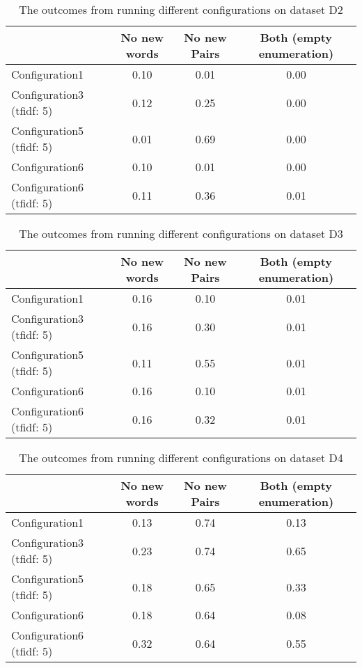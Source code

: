 \begin{table}
  \begin{tabular}{|l|c|c|c|}
    \hline
    &  No new words & No new Pairs & Both (empty enumeration) \\ \hline
    Configuration1                    & 0.10  & 0.01  & 0.00 \\ \hline
    Configuration3 (tfidf: 5)         & 0.12  & 0.25  & 0.00 \\ \hline
    Configuration5 (tfidf: 5)         & 0.01  & 0.69  & 0.00 \\ \hline
    Configuration6                    & 0.10  & 0.01  & 0.00 \\ \hline
    Configuration6 (tfidf: 5)         & 0.11  & 0.36  & 0.01 \\ \hline
  \end{tabular}
  \caption{The outcomes from running different configurations on dataset D2}
  \label{tab:d2}
\end{table}

\begin{table}
  \begin{tabular}{|l|c|c|c|}
    \hline
    &  No new words & No new Pairs & Both (empty enumeration) \\ \hline
    Configuration1                    & 0.16  & 0.10  & 0.01 \\ \hline
    Configuration3 (tfidf: 5)         & 0.16  & 0.30  & 0.01 \\ \hline
    Configuration5 (tfidf: 5)         & 0.11  & 0.55  & 0.01 \\ \hline
    Configuration6                    & 0.16  & 0.10  & 0.01 \\ \hline
    Configuration6 (tfidf: 5)         & 0.16  & 0.32  & 0.01 \\ \hline
  \end{tabular}
  \caption{The outcomes from running different configurations on dataset D3}
  \label{tab:d3}
\end{table}

\begin{table}
  \begin{tabular}{|l|c|c|c|}
    \hline
    &  No new words & No new Pairs & Both (empty enumeration) \\ \hline
    Configuration1                    & 0.13  & 0.74  & 0.13 \\ \hline
    Configuration3 (tfidf: 5)         & 0.23  & 0.74  & 0.65 \\ \hline
    Configuration5 (tfidf: 5)         & 0.18  & 0.65  & 0.33 \\ \hline
    Configuration6                    & 0.18  & 0.64  & 0.08 \\ \hline
    Configuration6 (tfidf: 5)         & 0.32  & 0.64  & 0.55 \\ \hline
  \end{tabular}
  \caption{The outcomes from running different configurations on dataset D4}
  \label{tab:d4}
\end{table}
